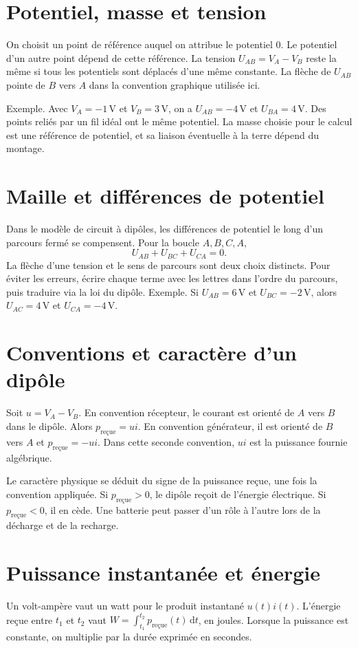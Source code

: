 \documentclass[11pt,a4paper]{article}
\begin{document}
\section*{Potentiel, masse et tension}
On choisit un point de référence auquel on attribue le potentiel $0$. Le potentiel d’un autre point dépend de cette référence. La tension $U_{AB}=V_A-V_B$ reste la même si tous les potentiels sont déplacés d’une même constante. La flèche de $U_{AB}$ pointe de $B$ vers $A$ dans la convention graphique utilisée ici.

Exemple. Avec $V_A=-1\,\mathrm V$ et $V_B=3\,\mathrm V$, on a $U_{AB}=-4\,\mathrm V$ et $U_{BA}=4\,\mathrm V$. Des points reliés par un fil idéal ont le même potentiel. La masse choisie pour le calcul est une référence de potentiel, et sa liaison éventuelle à la terre dépend du montage.

\section*{Maille et différences de potentiel}
Dans le modèle de circuit à dipôles, les différences de potentiel le long d’un parcours fermé se compensent. Pour la boucle $A,B,C,A$,
\[ U_{AB}+U_{BC}+U_{CA}=0. \]
La flèche d’une tension et le sens de parcours sont deux choix distincts. Pour éviter les erreurs, écrire chaque terme avec les lettres dans l’ordre du parcours, puis traduire via la loi du dipôle. Exemple. Si $U_{AB}=6\,\mathrm V$ et $U_{BC}=-2\,\mathrm V$, alors $U_{AC}=4\,\mathrm V$ et $U_{CA}=-4\,\mathrm V$.

\section*{Conventions et caractère d’un dipôle}
Soit $u=V_A-V_B$. En convention récepteur, le courant est orienté de $A$ vers $B$ dans le dipôle. Alors $p_{\text{reçue}}=ui$. En convention générateur, il est orienté de $B$ vers $A$ et $p_{\text{reçue}}=-ui$. Dans cette seconde convention, $ui$ est la puissance fournie algébrique.

Le caractère physique se déduit du signe de la puissance reçue, une fois la convention appliquée. Si $p_{\text{reçue}}>0$, le dipôle reçoit de l’énergie électrique. Si $p_{\text{reçue}}<0$, il en cède. Une batterie peut passer d’un rôle à l’autre lors de la décharge et de la recharge.

\section*{Puissance instantanée et énergie}
Un volt-ampère vaut un watt pour le produit instantané $u(t)i(t)$. L’énergie reçue entre $t_1$ et $t_2$ vaut $W=\int_{t_1}^{t_2}p_{\text{reçue}}(t)\,\mathrm dt$, en joules. Lorsque la puissance est constante, on multiplie par la durée exprimée en secondes.
\end{document}
